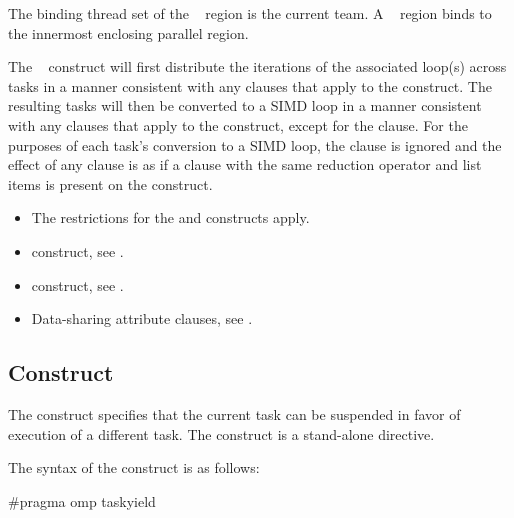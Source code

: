 \binding
The binding thread set of the ~ region is the current team. A ~ region binds to the innermost enclosing parallel region.

\descr
The ~ construct will first distribute the iterations of the associated loop(s) across tasks in a manner consistent with any clauses that apply to the  construct. The resulting tasks will then be converted to a SIMD loop in a manner consistent with any clauses that apply to the  construct, except for the  clause. For the purposes of each task's conversion to a SIMD loop, the  clause is ignored and the effect of any  clause is as if a  clause with the same reduction operator and list items is present on the construct.

\restrictions
\begin{itemize}
\item The restrictions for the  and  constructs apply.
\end{itemize}

\crossreferences
\begin{itemize}
\item {} construct, see .
\item {} construct, see .
\item Data-sharing attribute clauses, see . 
\end{itemize}




%
%
\subsection{ Construct}
\label{subsec:taskyield Construct}
\summary
The  construct specifies that the current task can be suspended in favor of 
execution of a different task. The  construct is a stand-alone directive.

\syntax
\ccppspecificstart
The syntax of the  construct is as follows:

\begin{boxedcode}
\#pragma omp taskyield 
\end{boxedcode}
\ccppspecificend

